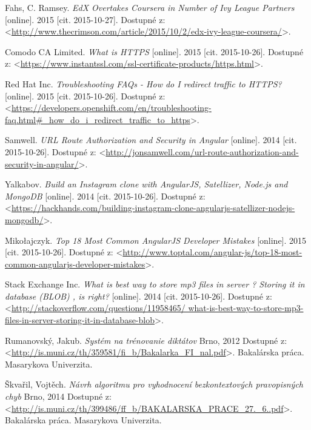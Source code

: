 \documentclass[12pt,oneside]{fithesis2}
\begin{document}
    \begin{thebibliography}{59}
  		Fahs, C. Ramsey.
  		\emph{EdX Overtakes Coursera in Number of Ivy League Partners}
  		[online].
  		2015
  		[cit. 2015-10-27].
  		Dostupné z: <\url{http://www.thecrimson.com/article/2015/10/2/edx-ivy-league-coursera/}>.

  		Comodo CA Limited.
  		\emph{What is HTTPS}
  		[online].
  		2015
  		[cit. 2015-10-26].
  		Dostupné z: <\url{https://www.instantssl.com/ssl-certificate-products/https.html}>.
	
  		Red Hat Inc.
  		\emph{Troubleshooting FAQs - How do I redirect traffic to HTTPS?}
  		[online].
  		2015
  		[cit. 2015-10-26].
  		Dostupné z: <\url{https://developers.openshift.com/en/troubleshooting-faq.html#_how_do_i_redirect_traffic_to_https}>.
  		
  		Samwell.
  		\emph{URL Route Authorization and Security in Angular}
  		[online].
  		2014
  		[cit. 2015-10-26].
  		Dostupné z: <\url{http://jonsamwell.com/url-route-authorization-and-security-in-angular/}>.
  		
  		Yalkabov.
  		\emph{Build an Instagram clone with AngularJS, Satellizer, Node.js and MongoDB}
  		[online].
  		2014
  		[cit. 2015-10-26].
  		Dostupné z: <\url{https://hackhands.com/building-instagram-clone-angularjs-satellizer-nodejs-mongodb/}>.
  		
  		Mikołajczyk.
  		\emph{Top 18 Most Common AngularJS Developer Mistakes}
  		[online].
  		2015
  		[cit. 2015-10-26].
  		Dostupné z: <\url{http://www.toptal.com/angular-js/top-18-most-common-angularjs-developer-mistakes}>.
  			
  		Stack Exchange Inc.
  		\emph{What is best way to store mp3 files in server ? Storing it in database (BLOB) , is right?}
  		[online].
  		2014
  		[cit. 2015-10-26].
  		Dostupné z: <\url{http://stackoverflow.com/questions/11958465/
  		what-is-best-way-to-store-mp3-files-in-server-storing-it-in-database-blob}>.
  		
  		Rumanovský, Jakub.
  		\emph{Systém na trénovanie diktátov}
  		Brno, 
  		2012
  		Dostupné z: <\url{http://is.muni.cz/th/359581/fi_b/Bakalarka_FI_nal.pdf}>.
  		Bakalárska práca. Masarykova Univerzita.
  		
  		Škvařil, Vojtěch.
  		\emph{Návrh algoritmu pro vyhodnocení bezkontextových pravopisných chyb}
  		Brno, 
  		2014
  		Dostupné z: <\url{http://is.muni.cz/th/399486/ff_b/BAKALARSKA_PRACE_27._6..pdf}>.
  		Bakalárska práca. Masarykova Univerzita.
  		

\end{thebibliography}
\end{document}
